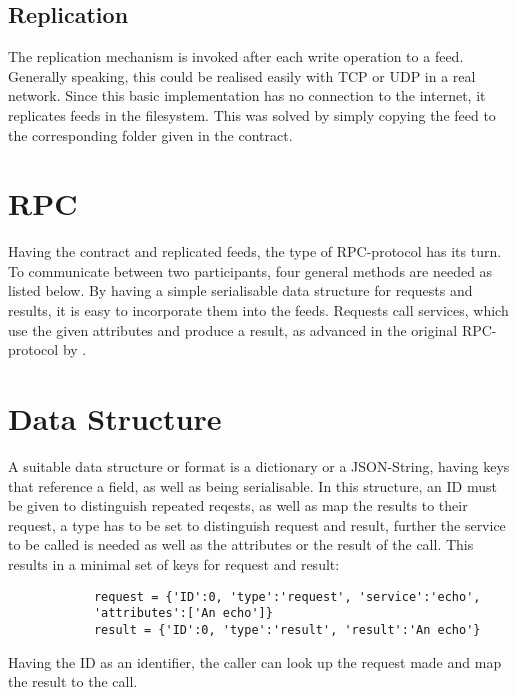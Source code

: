 \subsection{Replication}
The replication mechanism is invoked after each write operation to a feed. Generally speaking, this could be realised easily with TCP or UDP in a real network. Since this basic implementation has no connection to the internet, it replicates feeds in the filesystem. This was solved by simply copying the feed to the corresponding folder given in the contract.
\section{RPC}
Having the contract and replicated feeds, the type of RPC-protocol has its turn. To communicate between two participants, four general methods are needed as listed below. By having a simple serialisable data structure for requests and results, it is easy to incorporate them into the feeds. Requests call services, which use the given attributes and produce a result, as advanced in the original RPC-protocol by \citet{birrell1984implementing}.
\section{Data Structure}
A suitable data structure or format is a dictionary or a JSON-String, having keys that reference a field, as well as being serialisable. In this structure, an ID must be given to distinguish repeated reqests, as well as map the results to their request, a type has to be set to distinguish request and result, further the service to be called is needed as well as the attributes or the result of the call. This results in a minimal set of keys for request and result:\\

    \begin{python}
        \begin{lstlisting}
            request = {'ID':0, 'type':'request', 'service':'echo', 
            'attributes':['An echo']}
            result = {'ID':0, 'type':'result', 'result':'An echo'}
        \end{lstlisting}
    \end{python}
    



Having the ID as an identifier, the caller can look up the request made and map the result to the call.
